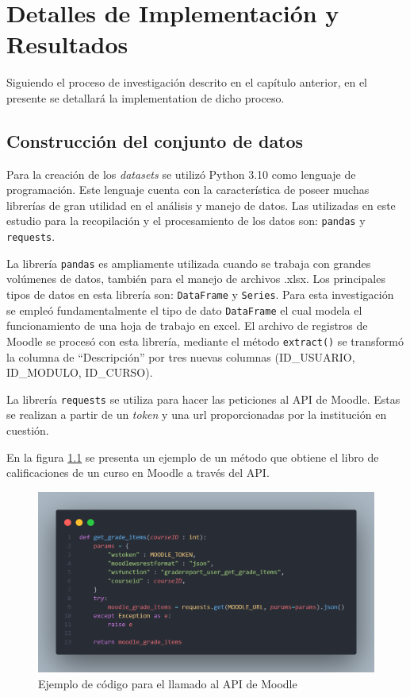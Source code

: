 \chapter{Detalles de Implementación y Resultados}\label{chapter:implementation}

Siguiendo el proceso de investigación descrito en el capítulo anterior, 
en el presente se detallará la implementation de dicho proceso. 

\section{Construcción del conjunto de datos}

Para la creación de los \textit{datasets} se utilizó Python 3.10 como lenguaje de programación. 
Este lenguaje cuenta con la característica de poseer muchas librerías de gran utilidad en el análisis y manejo de datos. Las utilizadas 
en este estudio para la recopilación y el procesamiento de los datos son: \texttt{pandas} y \texttt{requests}.  

La librería \texttt{pandas} es ampliamente utilizada cuando se trabaja con grandes volúmenes de datos, también para el manejo de archivos .xlsx. 
Los principales tipos de datos en esta librería son: \texttt{DataFrame} y \texttt{Series}. Para esta investigación se empleó fundamentalmente 
el tipo de dato \texttt{DataFrame} el cual modela el funcionamiento de una hoja de trabajo en excel. El archivo de registros de Moodle se procesó con esta librería, 
mediante el método \texttt{extract()} se transformó la columna de ``Descripción'' por tres nuevas columnas (ID\_USUARIO, ID\_MODULO, ID\_CURSO).  


La librería \texttt{requests} se utiliza para hacer las peticiones al API de Moodle. Estas se realizan a partir de un \textit{token} y una url proporcionadas por la institución en cuestión.  


En la figura \ref{ApiMoodle} se presenta un ejemplo de un método que obtiene el libro de calificaciones de un curso en Moodle a través del API. 

\newpage
\begin{figure}[htb]
    \centering
    \includegraphics[width = 1 \textwidth]{Graphics/code.png}
    \caption{Ejemplo de código para el llamado al API de Moodle}
    \label{ApiMoodle}
\end{figure}

